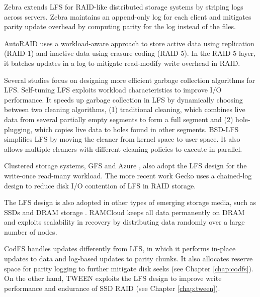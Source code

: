 Zebra \cite{hartman95} extends LFS for RAID-like distributed storage systems by
striping logs across servers. Zebra maintains an append-only log for each client
and mitigates parity update overhead by computing parity for the log instead of
the files. 

AutoRAID \cite{wilkes95} uses a workload-aware approach to store active data
using replication (RAID-1) and inactive data using erasure coding (RAID-5). In
the RAID-5 layer, it batches updates in a log to mitigate read-modify write
overhead in RAID.

Several studies focus on designing more efficient garbage collection algorithms
for LFS. Self-tuning LFS \cite{matthews97} exploits workload characteristics to
improve I/O performance. It speeds up garbage collection in LFS by dynamically
choosing between two cleaning algorithms, (1) traditional cleaning, which
combines live data from several partially empty segments to form a full segment
and (2) hole-plugging, which copies live data to holes found in other segments.
BSD-LFS \cite{seltzer93,seltzer95} simplifies LFS by moving the cleaner from
kernel space to user space. It also allows multiple cleaners with different
cleaning policies to execute in parallel.

Clustered storage systems, GFS \cite{ghemawat03} and Azure \cite{calder11}, also
adopt the LFS design for the write-once read-many workload.  The more recent
work Gecko \cite{shin13} uses a chained-log design to reduce disk \mbox{I/O} contention
of LFS in RAID storage.  

The LFS design is also adopted in other types of emerging storage media, such as
SSDs \cite{agrawal08} and DRAM storage \cite{ongaro11}.  RAMCloud
\cite{ongaro11} keeps all data
permanently on DRAM and exploits scalability in recovery by distributing data
randomly over a large number of nodes. 

CodFS handles updates differently from LFS, in which it performs in-place
updates to data and log-based updates to parity chunks.  It also allocates
reserve space for parity logging to further mitigate disk seeks (see Chapter
\ref{chap:codfs}).  On the other
hand, TWEEN exploits the LFS design to improve write performance and endurance
of SSD RAID (see Chapter \ref{chap:tween}).




